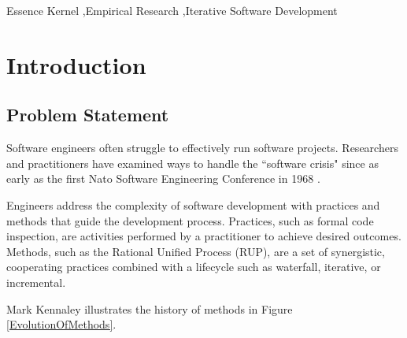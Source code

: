 \documentclass[preprint,12pt,3p]{elsarticle}
\begin{document}
\begin{frontmatter}
\begin{abstract}

\end{abstract}

\begin{keyword}
Essence Kernel \sep Empirical Research \sep Iterative Software Development
\end{keyword}

\end{frontmatter}


\section{Introduction}

\subsection{Problem Statement}
Software engineers often struggle to effectively run software projects. Researchers and practitioners have examined ways to handle the ``software crisis" since as early as the first Nato Software Engineering Conference in 1968 \cite{Naur1969}. 

Engineers address the complexity of software development with practices and methods that guide the development process. Practices, such as formal code inspection, are activities performed by a practitioner to achieve desired outcomes. Methods, such as the Rational Unified Process (RUP), are a set of synergistic, cooperating practices combined with a lifecycle such as waterfall, iterative, or incremental.

Mark Kennaley illustrates the history of methods \cite{SDLC} in Figure \ref{EvolutionOfMethods}.
\end{document}
